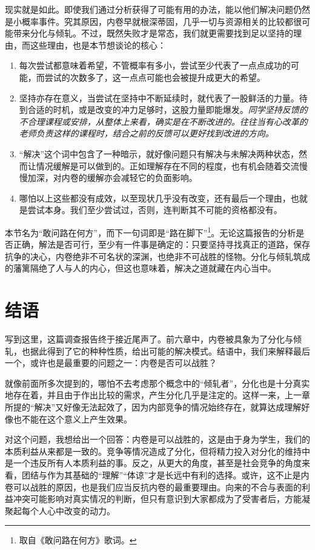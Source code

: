 \documentclass[UTF8,a4paper,fontset=windows,11pt,openany]{ctexbook}
\begin{document}
现实就是如此。即使我们通过分析获得了可能有用的办法，能以他们解决问题仍然是小概率事件。究其原因，内卷早就根深蒂固，几乎一切与资源相关的比较都很可能带来分化与倾轧。不过，既然失败才是常态，我们就更需要找到足以坚持的理由，而这些理由，也是本节想谈论的核心：
\begin{enumerate}
    \item 每次尝试都意味着希望，不管概率有多小，尝试至少代表了一点点成功的可能，而尝试的次数多了，这一点点可能也会被提升成更大的希望。
    \item 坚持亦存在意义，当尝试在坚持中不断延续时，就代表了一股鲜活的力量。待到合适的时机，或是改变的冲力足够时，这股力量即能爆发。\emph{同学坚持反馈的不合理课程或安排，从整体上来看，确实是在不断改进的。往往当有心改革的老师负责这样的课程时，结合之前的反馈可以更好找到改进的方向。}
    \item “解决”这个词中包含了一种暗示，就好像问题只有解决与未解决两种状态，然而让情况缓解是可以做到的。正如理解存在不同的程度，也有机会随着交流慢慢加深，对内卷的缓解亦会减轻它的负面影响。
    \item 哪怕以上这些都没有成效，以至现状几乎没有改变，还有最后一个理由，也就是尝试本身。我们至少尝试过，否则，连判断其不可能的资格都没有。
\end{enumerate}

本节名为“敢问路在何方”，而下一句词即是“路在脚下”\footnote{取自《敢问路在何方》歌词。}。无论这篇报告的分析是否正确，解法是否可行，至少有一件事是确定的：只要坚持寻找真正的道路，保存抗争的决心，内卷绝非不可名状的深渊，也绝非不可战胜的怪物。分化与倾轧筑成的藩篱隔绝了人与人的内心，但这也意味着，解决之道就藏在内心当中。

\chapter{结语}

写到这里，这篇调查报告终于接近尾声了。前六章中，内卷被具象为了分化与倾轧，也据此得到了它的种种性质，给出可能的解决模式。结语中，我们来解释最后一个，或许也是最重要的问题之一：内卷是否可以战胜？

就像前面所多次提到的，哪怕不去考虑那个概念中的“倾轧者”，分化也是十分真实地存在着，并且由于作出比较的需求，产生分化几乎是注定的。这样一来，上一章所提的“解决”又好像无法起效了，因为内部竞争的情况始终存在，就算达成理解好像也不能在这个意义上产生效果。

对这个问题，我想给出一个回答：内卷是可以战胜的，这是由于身为学生，我们的本质利益从来都是一致的。竞争等情况造成了分化，但将精力投入对分化的维持中是一个违反所有人本质利益的事。反之，从更大的角度，甚至是社会竞争的角度来看，团结与作为其基础的“理解”“体谅”才是长远中有利的选择。或许，这不止是内卷可以战胜的原因，也是我们应当反抗内卷的最重要理由。向来的不合与表面的利益冲突可能影响对真实情况的判断，但只有意识到大家都成为了受害者后，方能凝聚起每个人心中改变的动力。
\end{document}
